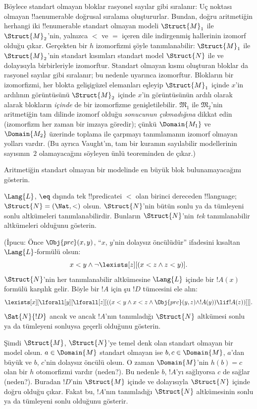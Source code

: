 Böylece standart olmayan bloklar rasyonel sayılar gibi sıralanır: Uç noktası
olmayan !!a{enumerable} doğrusal sıralama oluştururlar. Bundan, doğru
aritmetiğin herhangi iki !!{enumerable} standart olmayan modeli
$\Struct{M}_1$ ile $\Struct{M}_2$'nin, yalnızca $<$ ve $=$ içeren dile
indirgenmiş hallerinin izomorf olduğu çıkar. Gerçekten bir $h$ izomorfizmi
şöyle tanımlanabilir: $\Struct{M}_1$ ile $\Struct{M}_2$'nin standart kısımları
standart model $\Struct{N}$ ile ve dolayısıyla birbirleriyle izomorftur.
Standart olmayan kısmı oluşturan bloklar da rasyonel sayılar gibi sıralanır;
bu nedenle  uyarınca izomorftur. Blokların bir
izomorfizmi, her blokta gelişigüzel elemanları eşleyip $\Struct{M}_1$ içinde
$x$'in ardılının görüntüsünü $\Struct{M}_2$ içinde $x$'in görüntüsünün ardılı
olarak alarak blokların \emph{içinde} de bir izomorfizme genişletilebilir.
$\mathfrak{M}_1$ ile $\mathfrak{M}_2$'nin aritmetiğin tam dilinde izomorf
olduğu \emph{sonucunun çıkmadığına} dikkat edin (izomorfizm her zaman bir
imzaya göredir); çünkü $\Domain{M_1}$ ve $\Domain{M_2}$ üzerinde toplama ile
çarpmayı tanımlamanın izomorf olmayan yolları vardır. (Bu ayrıca Vaught'ın,
tam bir kuramın sayılabilir modellerinin sayısının~$2$ olamayacağını söyleyen
ünlü teoreminden de çıkar.)

\begin{prob}
Aritmetiğin standart olmayan bir modelinde en büyük blok bulunamayacağını
gösterin.
\end{prob}

\begin{prob}
$\Lang{L}$, $\eq$ dışında tek !!{predicate}{}i $<$ olan birinci dereceden
!!{language}; $\Struct{N} = (\Nat,<)$ olsun. $\Struct{N}$'nin bütün sonlu ya
da tümleyeni sonlu altkümeleri tanımlanabilirdir. Bunların $\Struct{N}$'nin
\emph{tek} tanımlanabilir altkümeleri olduğunu gösterin.

(İpucu: Önce $\Obj{prc}(x,y)$, ``$x$, $y$'nin dolaysız öncülüdür'' ifadesini
kısaltan $\Lang{L}$-formülü olsun:
\[
x<y \land \lnot \lexists[z][(x<z \land z < y)].
\]
$\Struct{N}$'nin her tanımlanabilir altkümesine $\Lang{L}$ içinde bir
$!A(x)$ formülü karşılık gelir. Böyle bir $!A$ için şu $!D$ tümcesini ele alın:
\[
\lexists[x][\lforall[y][\lforall[z][((x<y \land x<z \land \Obj{prc}(y,z)
  \land !A(y)) \lif !A(z))]]].
\]
$\Sat{N}{!D}$ ancak ve ancak $!A$'nın tanımladığı $\Struct{N}$ altkümesi
sonlu ya da tümleyeni sonluysa geçerli olduğunu gösterin.

Şimdi $\Struct{M}$, $\Struct{N}$'ye temel denk olan standart olmayan bir
model olsun. $a \in \Domain{M}$ standart olmayan ise $b,c \in \Domain{M}$,
$a$'dan büyük ve $b$, $c$'nin dolaysız öncülü olsun. O zaman
$\Domain{M}$'nin $h(b)=c$ olan bir $h$ otomorfizmi vardır (neden?). Bu nedenle
$b$, $!A$'yı sağlıyorsa $c$ de sağlar (neden?). Buradan $!D$'nin
$\Struct{M}$ içinde ve dolayısıyla $\Struct{N}$ içinde doğru olduğu çıkar.
Fakat bu, $!A$'nın tanımladığı $\Struct{N}$ altkümesinin sonlu ya da tümleyeni
sonlu olduğunu gösterir.
\end{prob}

